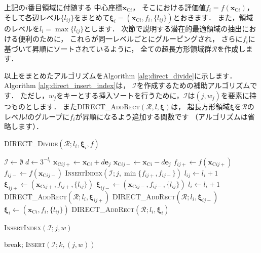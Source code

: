 ﻿\documentclass{jsarticle}
\begin{document}
上記の$i$番目領域に付随する
中心座標$\bm{x}_{\mathrm{C}i}$，
そこにおける評価値$f_{i}=f(\bm{x}_{\mathrm{C}i})$，
そして各辺レベル$\{l_{ij}\}$をまとめて$\bm{\xi}_{i}=(\bm{x}_{\mathrm{C}i},f_{i},\{l_{ij}\})$とおきます．
また，領域のレベルを$l_{i}=\max\{l_{ij}\}$とします．
次節で説明する潜在的最適領域の抽出における便利のために，
これらが同一レベルごとにグルーピングされ，
さらに$f_{i}$に基づいて昇順にソートされているように，
全ての超長方形領域群$\mathcal{R}$を作成します．

以上をまとめたアルゴリズムをAlgorithm \ref{alg:direct_divide}に示します．
Algorithm \ref{alg:direct_insert_index}は，
$\mathcal{I}$を作成するための補助アルゴリズムです．
ただし，$w_{j}$をキーとする挿入ソートを行うために，$\mathcal{I}$は$(j,w_{j})$を要素に持つものとします．
また\textsc{DIRECT\_AddRect}$(\mathcal{R},l,\bm{\xi})$は，
超長方形領域$\bm{\xi}$を$\mathcal{R}$のレベル$l$のグループに$f_{i}$が昇順になるよう追加する関数です
（アルゴリズムは省略します）．

\begin{algorithm}[tbh]
\caption{\textsc{DIRECT\_Divide}$(\mathcal{R};l_{i},\bm{\xi}_{i},f)$}
\label{alg:direct_divide}
\begin{algorithmic}[1]
\State $\mathcal{I}\leftarrow\emptyset$
\State $d\leftarrow 3^{-l_{i}}$
    \State $\bm{x}_{\mathrm{C}ij+}\leftarrow\bm{x}_{\mathrm{C}i}+d\bm{e}_{j}$
    \State $\bm{x}_{\mathrm{C}ij-}\leftarrow\bm{x}_{\mathrm{C}i}-d\bm{e}_{j}$
    \State $f_{ij+}\leftarrow f(\bm{x}_{\mathrm{C}ij+})$
    \State $f_{ij-}\leftarrow f(\bm{x}_{\mathrm{C}ij-})$
    \State \textsc{InsertIndex}$(\mathcal{I};j,\min\{f_{ij+},f_{ij-}\})$
  \EndIf
\EndFor
{}
  \State $l_{ij}\leftarrow l_{i}+1$
  \State $\bm{\xi}_{ij+}\leftarrow(\bm{x}_{\mathrm{C}ij+},f_{ij+},\{l_{ij}\})$
  \State $\bm{\xi}_{ij-}\leftarrow(\bm{x}_{\mathrm{C}ij-},f_{ij-},\{l_{ij}\})$
    \State $l_{i}\leftarrow l_{i}+1$
  \EndIf
  \State \textsc{DIRECT\_AddRect}$(\mathcal{R};l_{i},\bm{\xi}_{ij+})$
  \State \textsc{DIRECT\_AddRect}$(\mathcal{R};l_{i},\bm{\xi}_{ij-})$
\EndFor
\State $\bm{\xi}_{i}\leftarrow(\bm{x}_{\mathrm{C}i},f_{i},\{l_{ij}\})$
\State \textsc{DIRECT\_AddRect}$(\mathcal{R};l_{i},\bm{\xi}_{i})$
\end{algorithmic}
\end{algorithm}

\begin{algorithm}[tbh]
\caption{\textsc{InsertIndex}$(\mathcal{I};j,w)$}
\label{alg:direct_insert_index}
\begin{algorithmic}[1]
    \State break;
  \EndIf
\EndFor
\State \textsc{Insert}$(\mathcal{I};k,(j,w))$
\end{algorithmic}
\end{algorithm}
\end{document}
